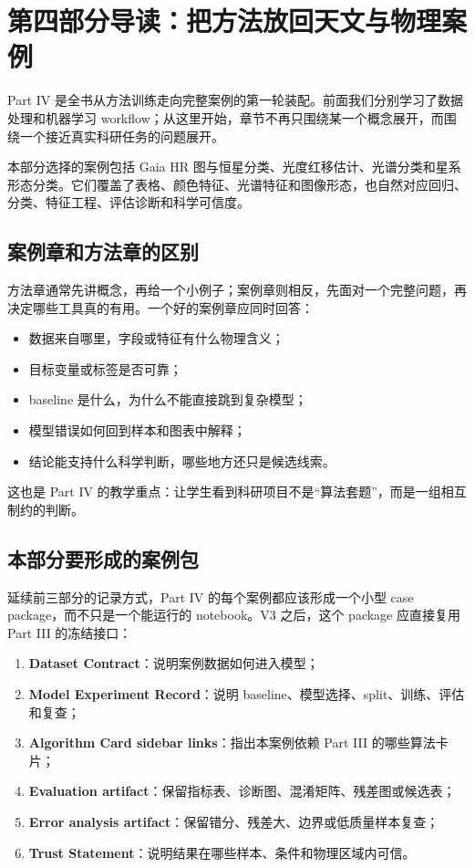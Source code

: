 \chapter*{第四部分导读：把方法放回天文与物理案例}

Part IV 是全书从方法训练走向完整案例的第一轮装配。前面我们分别学习了数据处理和机器学习 workflow；从这里开始，章节不再只围绕某一个概念展开，而围绕一个接近真实科研任务的问题展开。

本部分选择的案例包括 Gaia HR 图与恒星分类、光度红移估计、光谱分类和星系形态分类。它们覆盖了表格、颜色特征、光谱特征和图像形态，也自然对应回归、分类、特征工程、评估诊断和科学可信度。

\section*{案例章和方法章的区别}

方法章通常先讲概念，再给一个小例子；案例章则相反，先面对一个完整问题，再决定哪些工具真的有用。一个好的案例章应同时回答：

\begin{itemize}
    \item 数据来自哪里，字段或特征有什么物理含义；
    \item 目标变量或标签是否可靠；
    \item baseline 是什么，为什么不能直接跳到复杂模型；
    \item 模型错误如何回到样本和图表中解释；
    \item 结论能支持什么科学判断，哪些地方还只是候选线索。
\end{itemize}

这也是 Part IV 的教学重点：让学生看到科研项目不是“算法套题”，而是一组相互制约的判断。

\section*{本部分要形成的案例包}

延续前三部分的记录方式，Part IV 的每个案例都应该形成一个小型 case package，而不只是一个能运行的 notebook。V3 之后，这个 package 应直接复用 Part III 的冻结接口：

\begin{enumerate}
    \item \textbf{Dataset Contract}：说明案例数据如何进入模型；
    \item \textbf{Model Experiment Record}：说明 baseline、模型选择、split、训练、评估和复查；
    \item \textbf{Algorithm Card sidebar links}：指出本案例依赖 Part III 的哪些算法卡片；
    \item \textbf{Evaluation artifact}：保留指标表、诊断图、混淆矩阵、残差图或候选表；
    \item \textbf{Error analysis artifact}：保留错分、残差大、边界或低质量样本复查；
    \item \textbf{Trust Statement}：说明结果在哪些样本、条件和物理区域内可信。
\end{enumerate}

